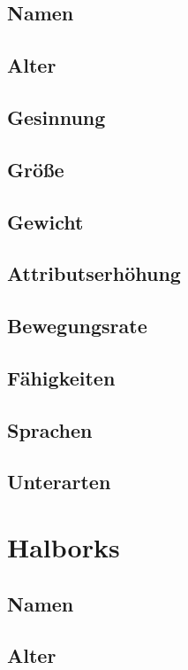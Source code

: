 \subsection*{Namen}
\subsection*{Alter}
\subsection*{Gesinnung}
\subsection*{Größe}
\subsection*{Gewicht}
\subsection*{Attributserhöhung}
\subsection*{Bewegungsrate}
\subsection*{Fähigkeiten}
\subsection*{Sprachen}
\subsection*{Unterarten}


%

\newpage
\section{Halborks}

\subsection*{Namen}
\subsection*{Alter}
